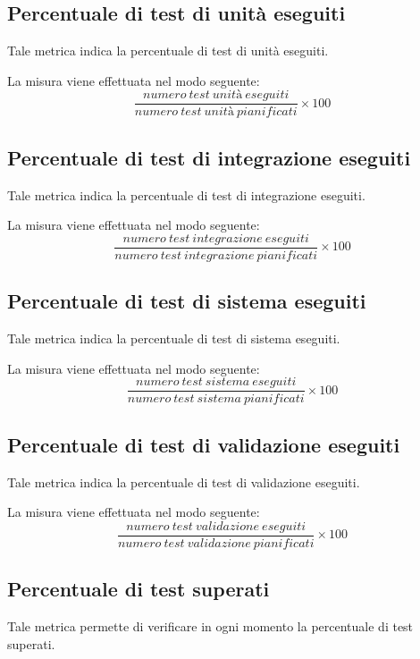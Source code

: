 \subsection{Percentuale di test di unità eseguiti}
Tale metrica indica la percentuale di test di unità eseguiti.

La misura viene effettuata nel modo seguente:
\begin{equation}
	\frac{numero~test~unità~eseguiti}{numero~test~unità~pianificati}\times100
\end{equation}


\subsection{Percentuale di test di integrazione eseguiti}
Tale metrica indica la percentuale di test di integrazione eseguiti.

La misura viene effettuata nel modo seguente:
\begin{equation}
	\frac{numero~test~integrazione~eseguiti}{numero~test~integrazione~pianificati}\times100
\end{equation}


\subsection{Percentuale di test di sistema eseguiti}
Tale metrica indica la percentuale di test di sistema eseguiti.

La misura viene effettuata nel modo seguente:
\begin{equation}
	\frac{numero~test~sistema~eseguiti}{numero~test~sistema~pianificati}\times100
\end{equation}


\subsection{Percentuale di test di validazione eseguiti}
Tale metrica indica la percentuale di test di validazione eseguiti.

La misura viene effettuata nel modo seguente:
\begin{equation}
	\frac{numero~test~validazione~eseguiti}{numero~test~validazione~pianificati}\times100
\end{equation}


\subsection{Percentuale di test superati}
Tale metrica permette di verificare in ogni momento la percentuale di test superati.

